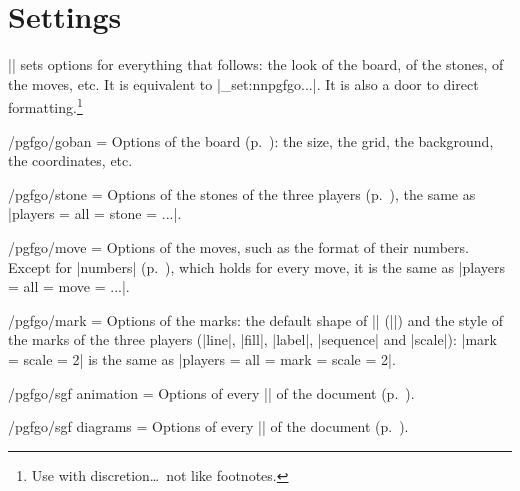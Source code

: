\section{Settings}
\label{sec:configuracion}

|| sets options for everything that follows: the look of the board, of the stones, of the moves, etc. It is equivalent to |\keys_set:nn{pgfgo}{...}|. It is also a door to direct formatting.\footnote{Use with discretion\dots\ not like footnotes.}

\begin{command}{\pgfgoset{}}
\end{command}

\begin{key}{/pgfgo/goban = }
	Options of the board (p.~\pageref{sec:tablero}): the size, the grid, the background, the coordinates, etc.
\end{key}

\begin{key}{/pgfgo/stone = }
	Options of the stones of the three players (p.~\pageref{sec:piedras}), the same as |players = {all = {stone = {...}}}|.
\end{key}

\begin{key}{/pgfgo/move = }
	Options of the moves, such as the format of their numbers. Except for |numbers| (p.~\pageref{subsec:movimientos}), which holds for every move, it is the same as |players = {all = {move = {...}}}|.
\end{key}

\begin{key}{/pgfgo/mark = }
	Options of the marks: the default shape of |\marks| (||) and the style of the marks of the three players (|line|, |fill|, |label|, |sequence| and |scale|): |mark = {scale = 2}| is the same as |players = {all = {mark = {scale = 2}}}|.
\end{key}

\begin{key}{/pgfgo/sgf animation = }
	Options of every |\sgfanimation| of the document (p.~\pageref{subsec:sgfanimacion}).
\end{key}

\begin{key}{/pgfgo/sgf diagrams = }
	Options of every |\sgfdiagrams| of the document (p.~\pageref{subsec:sgfdiagramas}).
\end{key}

